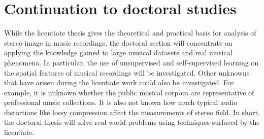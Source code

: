 \documentclass[a4paper]{article}
\begin{document}
\section{Continuation to doctoral studies}
While the licentiate thesis gives the theoretical and practical basis for analysis of stereo image in music recordings, the doctoral section will concentrate on applying the knowledge gained to large musical datasets and real musical phenomena. In particular, the use of unsupervised and self-supervised learning on the spatial features of musical recordings will be investigated. Other unknowns that have arisen during the licentiate work could also be investigated. For example, it is unknown whether the public musical corpora are representative of professional music collections. It is also not known how much typical audio distortions like lossy compression affect the measurements of stereo field. In short, the doctoral thesis will solve real-world problems using techniques surfaced by the licentiate.


\printglossaries

\printbibliography

\clearpage  %
\end{document}
